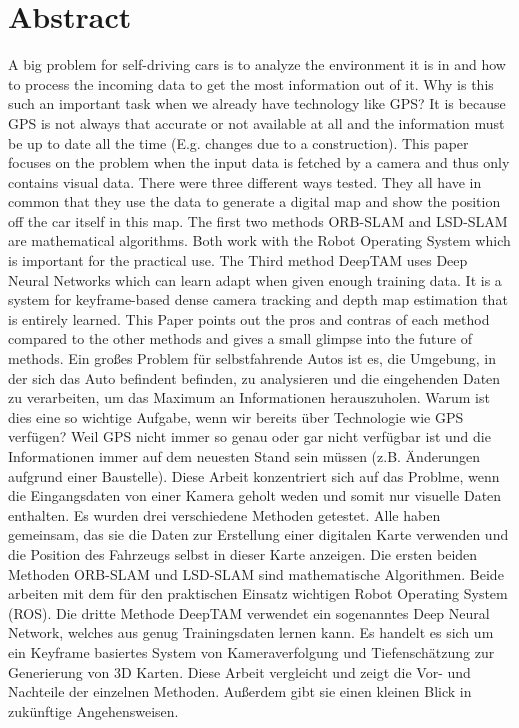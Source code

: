 

\chapter*{Abstract}
A big problem for self-driving cars is to analyze the environment it is in and how to process the incoming data to get the most information out of it.  Why is this such an important task when we already have technology like GPS? It is because GPS is not always that accurate or not available at all and the information must be up to date all the time (E.g. changes due to a construction). This paper focuses on the problem when the input data is fetched by a camera and thus only contains visual data. There were three different ways tested. They all have in common that they use the data to generate a digital map and show the position off the car itself in this map. The first two methods ORB-SLAM and LSD-SLAM are mathematical algorithms. Both work with the Robot Operating System which is important for the practical use. The Third method DeepTAM uses Deep Neural Networks which can learn adapt when given enough training data. It is a system for keyframe-based dense camera tracking and depth map estimation that is entirely learned. This Paper points out the pros and contras of each method compared to the other methods and gives a small glimpse into the future of methods.
\newline
\newline
\newline
\newline
Ein großes Problem für selbstfahrende Autos ist es, die Umgebung, in der sich das Auto befindent befinden, zu analysieren und die eingehenden Daten zu verarbeiten, um das Maximum an Informationen herauszuholen.  Warum ist dies eine so wichtige Aufgabe, wenn wir bereits über Technologie wie GPS verfügen? Weil GPS nicht immer so genau oder gar nicht verfügbar ist und die Informationen immer auf dem neuesten Stand sein müssen (z.B. Änderungen aufgrund einer Baustelle). Diese Arbeit konzentriert sich auf das Problme, wenn die Eingangsdaten von einer Kamera geholt weden und somit nur visuelle Daten enthalten. Es wurden drei verschiedene Methoden getestet. Alle haben gemeinsam, das sie die Daten zur Erstellung einer digitalen Karte verwenden und die Position des Fahrzeugs selbst in dieser Karte anzeigen. Die ersten beiden Methoden ORB-SLAM und LSD-SLAM sind mathematische Algorithmen. Beide arbeiten mit dem für den praktischen Einsatz wichtigen Robot Operating System (ROS). Die dritte Methode DeepTAM verwendet ein sogenanntes Deep Neural Network, welches aus genug Trainingsdaten lernen kann. Es handelt es sich um ein Keyframe basiertes System von Kameraverfolgung und Tiefenschätzung zur Generierung von 3D Karten. Diese Arbeit vergleicht und zeigt die Vor- und Nachteile der einzelnen Methoden. Außerdem gibt sie einen kleinen Blick in zukünftige Angehensweisen.
 

